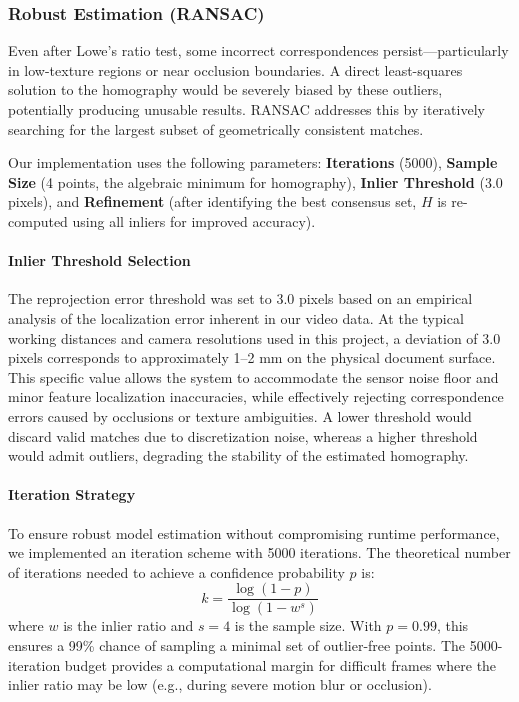 \documentclass[10pt,twocolumn]{extarticle}
\begin{document}
\subsubsection{Robust Estimation (RANSAC)}
Even after Lowe's ratio test, some incorrect correspondences persist---particularly in low-texture regions or near occlusion boundaries. A direct least-squares solution to the homography would be severely biased by these outliers, potentially producing unusable results. RANSAC addresses this by iteratively searching for the largest subset of geometrically consistent matches.

Our implementation uses the following parameters: \textbf{Iterations} (5000), \textbf{Sample Size} (4 points, the algebraic minimum for homography), \textbf{Inlier Threshold} (3.0 pixels), and \textbf{Refinement} (after identifying the best consensus set, $H$ is re-computed using all inliers for improved accuracy).

\paragraph{Inlier Threshold Selection}
The reprojection error threshold was set to 3.0 pixels based on an empirical analysis of the localization error inherent in our video data. At the typical working distances and camera resolutions used in this project, a deviation of 3.0 pixels corresponds to approximately 1--2 mm on the physical document surface. This specific value allows the system to accommodate the sensor noise floor and minor feature localization inaccuracies, while effectively rejecting correspondence errors caused by occlusions or texture ambiguities. A lower threshold would discard valid matches due to discretization noise, whereas a higher threshold would admit outliers, degrading the stability of the estimated homography.

\paragraph{Iteration Strategy}
To ensure robust model estimation without compromising runtime performance, we implemented an iteration scheme with 5000 iterations. The theoretical number of iterations needed to achieve a confidence probability $p$ is:
\begin{equation}
    k = \frac{\log(1 - p)}{\log(1 - w^s)}
\end{equation}
where $w$ is the inlier ratio and $s = 4$ is the sample size. With $p = 0.99$, this ensures a 99\% chance of sampling a minimal set of outlier-free points. The 5000-iteration budget provides a computational margin for difficult frames where the inlier ratio may be low (e.g., during severe motion blur or occlusion).
\end{document}
